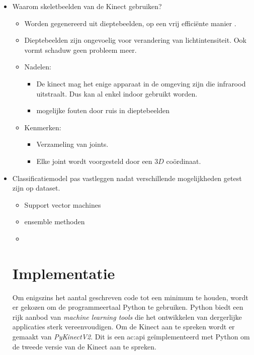 \begin{itemize}
	\item Waarom skeletbeelden van de Kinect gebruiken?
	\begin{itemize}
		\item Worden gegenereerd uit dieptebeelden, op een vrij efficiënte manier \cite{Shotton2011}.
		\item Dieptebeelden zijn ongevoelig voor verandering van lichtintensiteit. Ook vormt schaduw geen probleem meer.
		\item Nadelen:
		\begin{itemize}
			\item De kinect mag het enige apparaat in de omgeving zijn die infrarood uitstraalt. Dus kan al enkel indoor gebruikt worden.
			\item mogelijke fouten door ruis in dieptebeelden
		\end{itemize}
		\item Kenmerken:
		\begin{itemize}
			\item Verzameling van joints.
			\item Elke joint wordt voorgesteld door een $3D$ coördinaat.
		\end{itemize}
			
	\end{itemize}

	\item Classificatiemodel pas vastleggen nadat verschillende mogelijkheden getest zijn op dataset.
	\begin{itemize}
		\item Support vector machines
		\item ensemble methoden
		\item {}
	\end{itemize}


\section{Implementatie}
Om enigszins het aantal geschreven code tot een minimum te houden, wordt er gekozen om de programmeertaal Python te gebruiken. Python biedt een rijk aanbod van \textit{machine learning tools} die het ontwikkelen van dergerlijke applicaties sterk vereenvoudigen. Om de Kinect aan te spreken wordt er gemaakt van \textit{PyKinectV2}. Dit is een \gls{ac:api} geïmplementeerd met Python om de tweede versie van de Kinect aan te spreken.

  
\end{itemize}